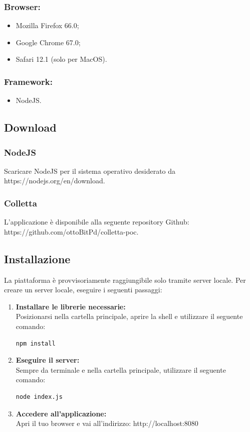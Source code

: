 \documentclass[11pt,a4paper]{article}
\begin{document}
{	\subsubsection{Browser:}
		\begin{itemize}
		\item Mozilla Firefox 66.0;
		\item Google Chrome 67.0;
		\item Safari 12.1 (solo per MacOS).		
	\end{itemize}
	\subsubsection{Framework:}
		\begin{itemize}
		\item NodeJS.
		\end{itemize}
	

	\subsection{Download}
	\subsubsection{NodeJS}
	Scaricare NodeJS per il sistema operativo desiderato da https://nodejs.org/en/download.
	\subsubsection{Colletta}		
	L'applicazione è disponibile alla seguente repository Github:
	https://github.com/ottoBitPd/colletta-poc.
	
	\subsection{Installazione}
	La piattaforma è provvisoriamente raggiungibile solo tramite server locale.
	Per creare un server locale, eseguire i seguenti passaggi:
	 \begin{enumerate}
	 	\item \textbf{Installare le librerie necessarie:}\\ Posizionarsi nella cartella principale, aprire la shell e utilizzare il seguente comando:\begin{lstlisting}[numbers=none]
	 	npm install
	 	\end{lstlisting}
	 	\item \textbf{Eseguire il server:}\\ Sempre da terminale e nella cartella principale, utilizzare il seguente comando:\begin{lstlisting}[numbers=none]
	 	node index.js
	 	\end{lstlisting}
	 	\item \textbf{Accedere all'applicazione:}\\ Apri il tuo browser e vai all'indirizzo: http://localhost:8080
	 \end{enumerate}
 
}
\end{document}
